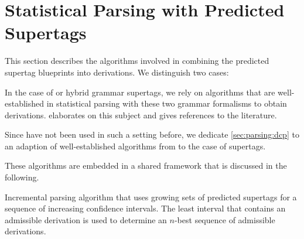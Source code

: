 \documentclass[../../document.tex]{subfiles}
\begin{document}
    \section{Statistical Parsing with Predicted Supertags}\label{sec:parsing}
    This section describes the algorithms involved in combining the predicted supertag blueprints into derivations.
    We distinguish two cases:
    \begin{inparaenum}[]
        \item In the case of  or hybrid grammar supertags, we rely on algorithms that are well-established in statistical parsing with these two grammar formalisms to obtain derivations.  elaborates on this subject and gives references to the literature.
        \item Since  have not been used in such a setting before, we dedicate \cref{sec:parsing:dcp} to an adaption of well-established algorithms from  to the case of  supertags.
    \end{inparaenum}
    These algorithms are embedded in a shared framework that is discussed in the following.

    \begin{algorithm}[t]
        \caption{\label{alg:parsing:incremental}
            Incremental parsing algorithm that uses growing sets of predicted supertags for a sequence of increasing confidence intervals.
            The least interval that contains an admissible derivation is used to determine an \(n\)-best sequence of admissible derivations.
        }
        
    \end{algorithm}
\end{document}
